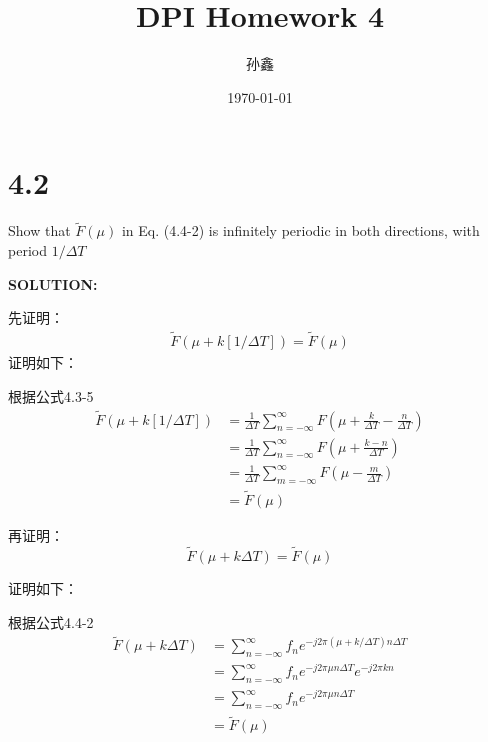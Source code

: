 \documentclass[UTF8,titlepage]{ctexart}
\title{DPI Homework 4}
\author{孙鑫}
\date{\today}
\newcommand{\suminf}{\sum_{n=-\infty}^{\infty}}
\begin{document}
\maketitle
\section*{4.2}
\setlength{\parindent}{0pt}Show that $\tilde{F}(\mu)$ in Eq. (4.4-2) is infinitely periodic in both directions, with period $1/\Delta T$

\textbf{SOLUTION:}

先证明：
\begin{align*}
    \tilde{F}(\mu+k[1/\Delta T])=\tilde{F}(\mu)
\end{align*}
证明如下：

根据公式4.3-5
\begin{align*}
    \tilde{F}(\mu+k[1/\Delta T]) & =\frac{1}{\Delta T}\sum_{n=-\infty}^{\infty}F(\mu+\frac{k}{\Delta T}-\frac{n}{\Delta T})\\
        & = \frac{1}{\Delta T}\sum_{n=-\infty}^{\infty}F(\mu+\frac{k-n}{\Delta T})\\
        & = \frac{1}{\Delta T}\sum_{m=-\infty}^{\infty}F(\mu-\frac{m}{\Delta T})\\
        & = \tilde{F}(\mu)
\end{align*}

再证明：
\begin{displaymath}
    \tilde{F}(\mu+k\Delta T)=\tilde{F}(\mu)
\end{displaymath}

证明如下：

根据公式4.4-2
\begin{align*}
    \tilde{F}(\mu+k\Delta T) &=\suminf f_ne^{-j2\pi(\mu+k/\Delta T)n\Delta T}\\
    &=\suminf f_ne^{-j2\pi\mu n\Delta T}e^{-j2\pi kn}\\
    &=\suminf f_ne^{-j2\pi\mu n\Delta T}\\
    &=\tilde{F}(\mu)
\end{align*}
\end{document}
